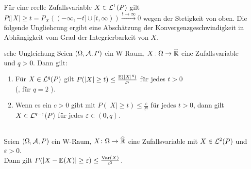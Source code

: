 \linie

\begin{Bem}
    Für eine reelle Zufallsvariable $X \in \mathcal{L}^1(P)$ gilt\\
    $P(|X| \ge t = P_X((-\infty, -t] \cup [t, \infty)) \xrightarrow{t \to \infty} 0$
    wegen der Stetigkeit von oben.
    Die folgende Ungliehcung ergibt eine Abschätzung der Konvergenzgeschwindigkeit in Abhängigkeit
    vom Grad der Integrierbarkeit von $X$.
\end{Bem}

\begin{Satz}{sche Ungleichung}
    Seien $(\Omega, \mathcal{A}, P)$ ein W-Raum, $X\colon \Omega \rightarrow \widehat{\mathbb{R}}$ eine Zufallsvariable
    und $q > 0$.
    Dann gilt:
    \begin{enumerate}
        \item
        Für $X \in \mathcal{L}^q(P)$ gilt $P(|X| \ge t) \le \frac{\mathbb{E}(|X|^q)}{t^q}$ für jedes $t > 0$\\
        (, für $q = 2$
        ).
        
        \item
        Wenn es ein $c > 0$ gibt mit $P(|X| \ge t) \le \frac{c}{t^q}$ für jedes $t > 0$,
        dann gilt $X \in \mathcal{L}^{q - \varepsilon}(P)$ für jedes $\varepsilon \in (0, q)$.
    \end{enumerate}
\end{Satz}

\begin{Kor}\\
    Seien $(\Omega, \mathcal{A}, P)$ ein W-Raum, $X\colon \Omega \rightarrow \widehat{\mathbb{R}}$ eine Zufallsvariable
    mit $X \in \mathcal{L}^2(P)$ und $\varepsilon > 0$.\\
    Dann gilt $P(|X - \mathbb{E}(X)| \ge \varepsilon) \le \frac{\text{Var}(X)}{\varepsilon^2}$.
\end{Kor}

\pagebreak

